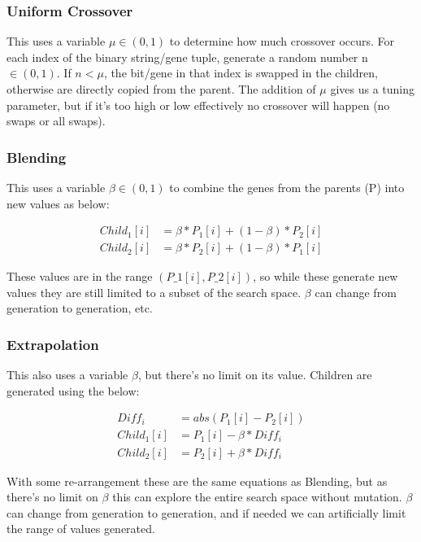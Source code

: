 \subsubsection{Uniform Crossover}
This uses a variable $\mu \in (0,1)$ to determine how much crossover occurs. For each index of the binary string/gene tuple, generate a random number n $\in (0,1)$. If $n < \mu$, the bit/gene in that index is swapped in the children, otherwise are directly copied from the parent. The addition of $\mu$ gives us a tuning parameter, but if it's too high or low effectively no crossover will happen (no swaps or all swaps).

\subsubsection{Blending}
This uses a variable $\beta \in (0,1)$ to combine the genes from the parents (P) into new values as below:

\begin{align}
    Child_1[i] &= \beta * P_1[i] + (1-\beta) * P_2[i] \nonumber\\
    Child_2[i] &= \beta * P_2[i] + (1-\beta) * P_1[i] \nonumber  
\end{align}

These values are in the range $(P\_1[i], P\_2[i])$, so while these generate new values they are still limited to a subset of the search space. $\beta$ can change from generation to generation, etc. 

\subsubsection{Extrapolation}
This also uses a variable $\beta$, but there's no limit on its value. Children are generated using the below:

\begin{align}
    Diff_i &= abs(P_1[i] - P_2[i]) \nonumber \\
    Child_1[i] &= P_1[i] - \beta * Diff_i \nonumber\\
    Child_2[i] &= P_2[i] + \beta * Diff_i \nonumber  
\end{align}

With some re-arrangement these are the same equations as Blending, but as there's no limit on $\beta$ this can explore the entire search space without mutation.  $\beta$ can change from generation to generation, and if needed we can artificially limit the range of values generated. 